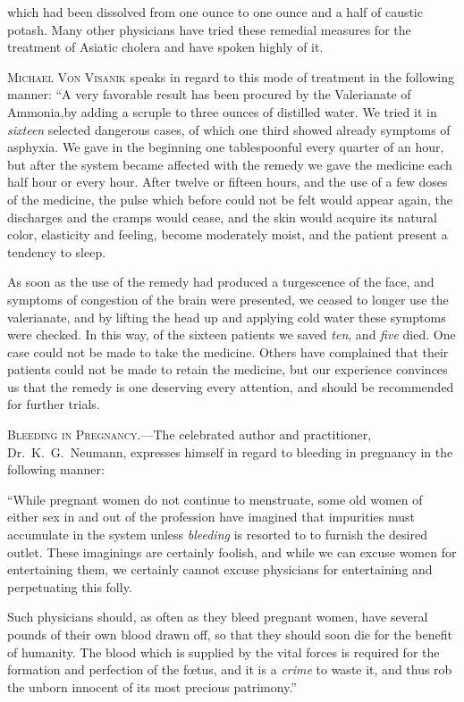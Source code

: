which had been dissolved from one ounce to one ounce and a half of
caustic potash. Many other physicians have tried these remedial
measures for the treatment of Asiatic cholera and have spoken highly
of it.

\textsc{Michael Von Visanik} speaks in regard to this mode of treatment
in the following manner: ``A very favorable result has been procured
by the Valerianate of Ammonia,by adding a scruple to three ounces of
distilled water. We tried it in \emph{sixteen} selected dangerous cases, of
which one third showed already symptoms of asphyxia. We gave in
the beginning one tablespoonful every quarter of an hour, but after
the system became affected with the remedy we gave the medicine
each half hour or every hour. After twelve or fifteen hours, and the
use of a few doses of the medicine, the pulse which before could not
be felt would appear again, the discharges and the cramps would cease,
and the skin would acquire its natural color, elasticity and feeling,
become moderately moist, and the patient present a tendency to sleep.

As soon as the use of the remedy had produced a turgescence of the
face, and symptoms of congestion of the brain were presented, we
ceased to longer use the valerianate, and by lifting the head up and
applying cold water these symptoms were checked. In this way, of
the sixteen patients we saved \emph{ten}, and \emph{five} died. One case could not
be made to take the medicine. Others have complained that their
patients could not be made to retain the medicine, but our experience
convinces us that the remedy is one deserving every attention, and
should be recommended for further trials.

\textsc{Bleeding in Pregnancy}.---The celebrated author and practitioner,
Dr.~K.~G.\ Neumann, expresses himself in regard to bleeding in pregnancy
in the following manner:


``While pregnant women do not continue to menstruate, some old
women of either sex in and out of the profession have imagined that
impurities must accumulate in the system unless \emph{bleeding} is resorted to
to furnish the desired outlet. These imaginings are certainly foolish,
and while we can excuse women for entertaining them, we certainly
cannot excuse physicians for entertaining and perpetuating this folly.

Such physicians should, as often as they bleed pregnant women,
have several pounds of their own blood drawn off, so that they should
soon die for the benefit of humanity. The blood which is supplied by
the vital forces is required for the formation and perfection of the fœtus,
and it is a \emph{crime} to waste it, and thus rob the unborn innocent of its
most precious patrimony.''\endinput
